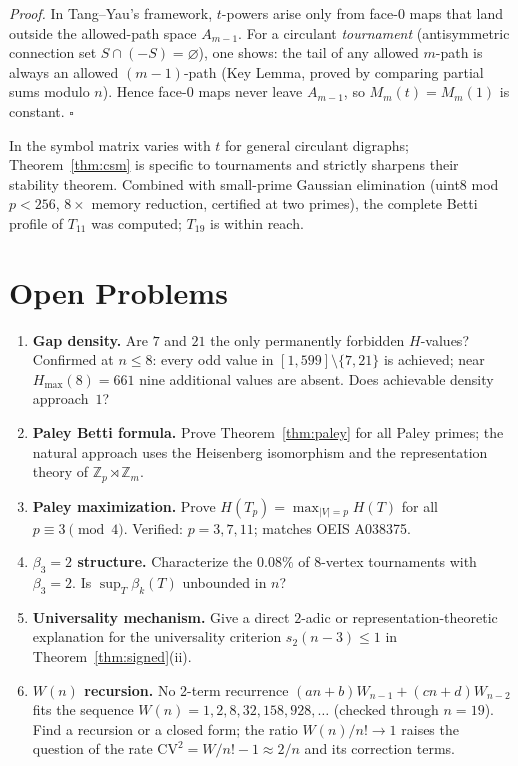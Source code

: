 \documentclass[11pt,reqno]{amsart}
\theoremstyle{plain}
\theoremstyle{definition}
\theoremstyle{remark}
\begin{document}
\noindent\emph{Proof.}
In Tang--Yau's framework, $t$-powers arise only from face-$0$ maps that
land outside the allowed-path space $A_{m-1}$.  For a circulant
\emph{tournament} (antisymmetric connection set $S\cap(-S)=\varnothing$),
one shows: the tail of any allowed $m$-path is always an allowed
$(m{-}1)$-path (Key Lemma, proved by comparing partial sums modulo $n$).
Hence face-$0$ maps never leave $A_{m-1}$, so $M_m(t)=M_m(1)$ is constant.
\hfill$\square$

\smallskip
In \cite{TY26} the symbol matrix varies with $t$ for general circulant
digraphs; Theorem~\ref{thm:csm} is specific to tournaments and strictly
sharpens their stability theorem.  Combined with small-prime Gaussian
elimination (uint8 mod $p<256$, $8\times$ memory reduction, certified at two
primes), the complete Betti profile of $T_{11}$ was computed; $T_{19}$ is
within reach.

\section{Open Problems}

\begin{enumerate}
\item \textbf{Gap density.} Are $7$ and $21$ the only permanently forbidden
$H$-values?  Confirmed at $n{\le}8$: every odd value in $[1,599]\setminus\{7,21\}$
is achieved; near $H_{\max}(8){=}661$ nine additional values are absent.
Does achievable density approach~$1$?
\item \textbf{Paley Betti formula.} Prove Theorem~\ref{thm:paley} for all Paley
primes; the natural approach uses the Heisenberg isomorphism and the
representation theory of $\mathbb{Z}_p\rtimes\mathbb{Z}_m$.
\item \textbf{Paley maximization.} Prove $H(T_p)=\max_{|V|=p}H(T)$ for all
$p\equiv 3\pmod 4$.  Verified: $p=3,7,11$; matches OEIS A038375.
\item \textbf{$\beta_3=2$ structure.} Characterize the $0.08\%$ of $8$-vertex
tournaments with $\beta_3=2$.  Is $\sup_T\beta_k(T)$ unbounded in $n$?
\item \textbf{Universality mechanism.} Give a direct $2$-adic or representation-theoretic
explanation for the universality criterion $s_2(n-3)\le 1$
in Theorem~\ref{thm:signed}\textup{(ii)}.
\item \textbf{$W(n)$ recursion.} No 2-term recurrence $(an{+}b)W_{n-1}+(cn{+}d)W_{n-2}$
fits the sequence $W(n)=1,2,8,32,158,928,\ldots$ (checked through $n{=}19$).
Find a recursion or a closed form; the ratio $W(n)/n!\to 1$ raises the question
of the rate $\mathrm{CV}^2=W/n!-1\approx 2/n$ and its correction terms.
\end{enumerate}
\end{document}
